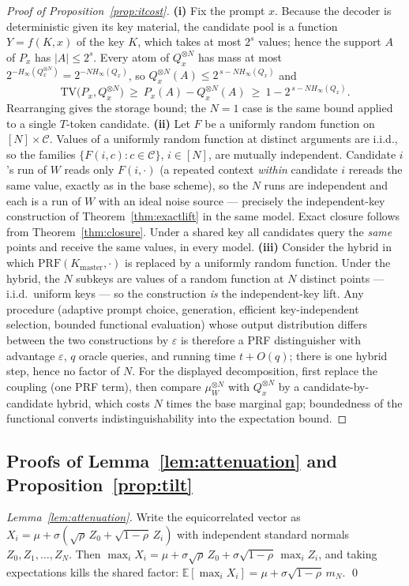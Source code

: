 \documentclass{article} %
\begin{document}
\begin{proof}[Proof of Proposition~\ref{prop:itcost}]
\textbf{(i)} Fix the prompt $x$. Because the decoder is deterministic given
its key material, the candidate pool is a function $Y=f(K,x)$ of the key
$K$, which takes at most $2^s$ values; hence the support $A$ of $P_x$ has
$|A|\le2^s$. Every atom of $Q_x^{\otimes N}$ has mass at most
$2^{-H_\infty(Q_x^{\otimes N})}=2^{-N H_\infty(Q_x)}$, so
$Q_x^{\otimes N}(A)\le2^{\,s-NH_\infty(Q_x)}$ and
\[
\mathrm{TV}\big(P_x,Q_x^{\otimes N}\big)\ \ge\ P_x(A)-Q_x^{\otimes N}(A)
\ \ge\ 1-2^{\,s-NH_\infty(Q_x)} .
\]
Rearranging gives the storage bound; the $N{=}1$ case is the same bound
applied to a single $T$-token candidate.
\textbf{(ii)} Let $F$ be a uniformly random function on
$[N]\times\mathcal C$. Values of a uniformly random function at distinct
arguments are i.i.d., so the families $\{F(i,c):c\in\mathcal C\}$,
$i\in[N]$, are mutually independent. Candidate $i$'s run of $W$ reads only
$F(i,\cdot)$ (a repeated context \emph{within} candidate $i$ rereads the
same value, exactly as in the base scheme), so the $N$ runs are independent
and each is a run of $W$ with an ideal noise source --- precisely the
independent-key construction of Theorem~\ref{thm:exactlift} in the same
model. Exact closure follows from Theorem~\ref{thm:closure}. Under a shared
key all candidates query the \emph{same} points and receive the same
values, in every model.
\textbf{(iii)} Consider the hybrid in which
$\mathrm{PRF}(K_{\mathrm{master}},\cdot)$ is replaced by a uniformly
random function. Under the hybrid, the $N$ subkeys are values of a random
function at $N$ distinct points --- i.i.d.\ uniform keys --- so the
construction \emph{is} the independent-key lift. Any procedure (adaptive
prompt choice, generation, efficient key-independent selection, bounded
functional evaluation) whose output distribution differs between the two
constructions by $\varepsilon$ is therefore a PRF distinguisher with
advantage $\varepsilon$, $q$ oracle queries, and running time $t+O(q)$;
there is one hybrid step, hence no factor of $N$. For the displayed
decomposition, first replace the coupling (one PRF term), then compare
$\mu_W^{\otimes N}$ with $Q_x^{\otimes N}$ by a candidate-by-candidate
hybrid, which costs $N$ times the base marginal gap; boundedness of the
functional converts indistinguishability into the expectation bound.
\end{proof}

\subsection{Proofs of Lemma~\ref{lem:attenuation} and Proposition~\ref{prop:tilt}}
\emph{Lemma~\ref{lem:attenuation}.} Write the equicorrelated vector as
$X_i=\mu+\sigma(\sqrt{\rho}\,Z_0+\sqrt{1-\rho}\,Z_i)$ with independent
standard normals $Z_0,Z_1,\dots,Z_N$. Then
$\max_i X_i=\mu+\sigma\sqrt{\rho}\,Z_0+\sigma\sqrt{1-\rho}\,\max_i Z_i$, and
taking expectations kills the shared factor:
$\mathbb E[\max_i X_i]=\mu+\sigma\sqrt{1-\rho}\,m_N$. \qed
\end{document}
